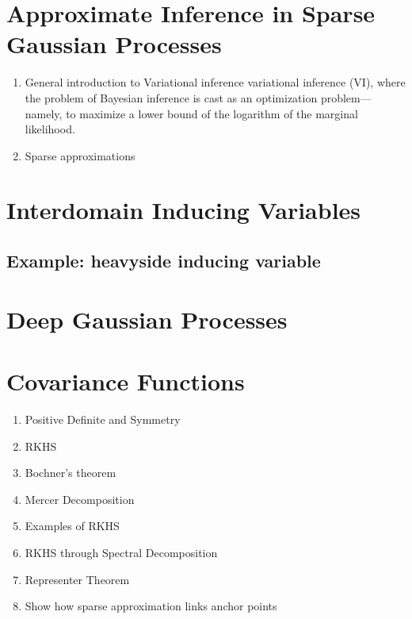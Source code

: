 \section{Approximate Inference in Sparse Gaussian Processes}

\begin{enumerate}
  \item General introduction to Variational inference \citep{blei2017variational}
variational inference (VI), where the problem of Bayesian inference is cast as an optimization problem—namely, to maximize a lower bound of the logarithm of the marginal likelihood.
  \item Sparse approximations \citep{Snelson05,quinonero2005unifying}
\end{enumerate}

\section{Interdomain Inducing Variables}

\subsection{Example: heavyside inducing variable}


\section{Deep Gaussian Processes}



\section{Covariance Functions}

\begin{enumerate}
  \item Positive Definite and Symmetry
  \item RKHS
  \item Bochner's theorem
  \item Mercer Decomposition
  \item Examples of RKHS
  \item RKHS through Spectral Decomposition
  \item Representer Theorem
  \item Show how sparse approximation links anchor points
\end{enumerate}
